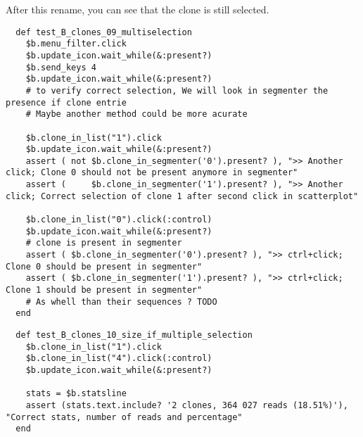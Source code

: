 \bigskip

After this rename, you can see that the clone is still selected.
\begin{verbatim}
  def test_B_clones_09_multiselection
    $b.menu_filter.click
    $b.update_icon.wait_while(&:present?)
    $b.send_keys 4
    $b.update_icon.wait_while(&:present?)
    # to verify correct selection, We will look in segmenter the presence if clone entrie
    # Maybe another method could be more acurate
    
    $b.clone_in_list("1").click
    $b.update_icon.wait_while(&:present?)
    assert ( not $b.clone_in_segmenter('0').present? ), ">> Another click; Clone 0 should not be present anymore in segmenter"
    assert (     $b.clone_in_segmenter('1').present? ), ">> Another click; Correct selection of clone 1 after second click in scatterplot"
   
    $b.clone_in_list("0").click(:control)
    $b.update_icon.wait_while(&:present?)
    # clone is present in segmenter
    assert ( $b.clone_in_segmenter('0').present? ), ">> ctrl+click; Clone 0 should be present in segmenter"
    assert ( $b.clone_in_segmenter('1').present? ), ">> ctrl+click; Clone 1 should be present in segmenter"
    # As whell than their sequences ? TODO
  end
\end{verbatim}

\begin{verbatim}
  def test_B_clones_10_size_if_multiple_selection
    $b.clone_in_list("1").click
    $b.clone_in_list("4").click(:control)
    $b.update_icon.wait_while(&:present?)

    stats = $b.statsline
    assert (stats.text.include? '2 clones, 364 027 reads (18.51%)'),  "Correct stats, number of reads and percentage"
  end
\end{verbatim}


